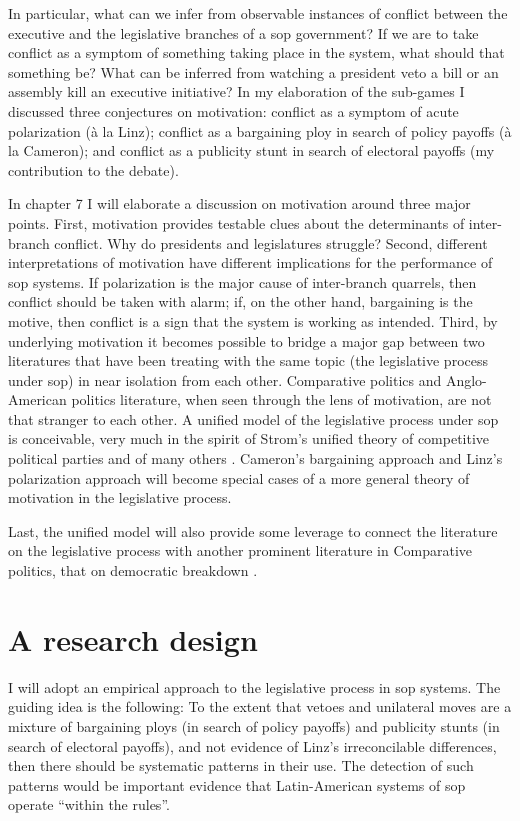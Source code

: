 In particular, what can we infer from observable instances of conflict between the executive and the legislative branches of a sop government?  If we are to take conflict as a symptom of something taking place in the system, what should that something be?  What can be inferred from watching a president veto a bill or an assembly kill an executive initiative?  In my elaboration of the sub-games I discussed three conjectures on motivation: conflict as a symptom of acute polarization (à la Linz); conflict as a bargaining ploy in search of policy payoffs (à la Cameron); and conflict as a publicity stunt in search of electoral payoffs (my contribution to the debate).  

In chapter 7 I will elaborate a discussion on motivation around three major points.  First, motivation provides testable clues about the determinants of inter-branch conflict.  Why do presidents and legislatures struggle?  Second, different interpretations of motivation have different implications for the performance of sop systems.  If polarization is the major cause of inter-branch quarrels, then conflict should be taken with alarm; if, on the other hand, bargaining is the motive, then conflict is a sign that the system is working as intended.  Third, by underlying motivation it becomes possible to bridge a major gap between two literatures that have been treating with the same topic (the legislative process under sop) in near isolation from each other.  Comparative politics and Anglo-American politics literature, when seen through the lens of motivation, are not that stranger to each other.  A unified model of the legislative process under sop is conceivable, very much in the spirit of Strom's \citeyearpar{strom.1990b} unified theory of competitive political parties and of many others \citep{cox.mccubbins.1993,kingdon.1977,schlesinger.1984}.  Cameron's bargaining approach and Linz's polarization approach will become special cases of a more general theory of motivation in the legislative process.  

Last, the unified model will also provide some leverage to connect the literature on the legislative process with another prominent literature in Comparative politics, that on democratic breakdown \citep{linz.stepan.1978,odonnell.1973}.  

\section{A research design}

I will adopt an empirical approach to the legislative process in sop systems.  The guiding idea is the following: To the extent that vetoes and unilateral moves are a mixture of bargaining ploys (in search of policy payoffs) and publicity stunts (in search of electoral payoffs), and not evidence of Linz's irreconcilable differences, then there should be systematic patterns in their use.  The detection of such patterns would be important evidence that Latin-American systems of sop operate ``within the rules''.  

